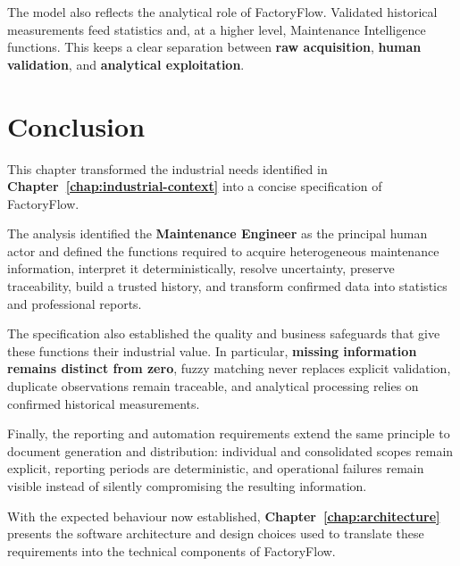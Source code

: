 The model also reflects the analytical role of FactoryFlow. Validated
historical measurements feed statistics and, at a higher level, Maintenance
Intelligence functions. This keeps a clear separation between
\textbf{raw acquisition}, \textbf{human validation}, and
\textbf{analytical exploitation}.



\section{Conclusion}
\label{sec:requirements-conclusion}

This chapter transformed the industrial needs identified in
\textbf{Chapter~\ref{chap:industrial-context}}
into a concise specification of FactoryFlow.

The analysis identified the \textbf{Maintenance Engineer} as the principal
human actor and defined the functions required to acquire heterogeneous
maintenance information, interpret it deterministically, resolve uncertainty,
preserve traceability, build a trusted history, and transform confirmed data
into statistics and professional reports.

The specification also established the quality and business safeguards that
give these functions their industrial value. In particular,
\textbf{missing information remains distinct from zero}, fuzzy matching never
replaces explicit validation, duplicate observations remain traceable, and
analytical processing relies on confirmed historical measurements.

Finally, the reporting and automation requirements extend the same principle
to document generation and distribution: individual and consolidated scopes
remain explicit, reporting periods are deterministic, and operational failures
remain visible instead of silently compromising the resulting information.

With the expected behaviour now established,
\textbf{Chapter~\ref{chap:architecture}}
presents the software architecture and design choices used to translate these
requirements into the technical components of FactoryFlow.
